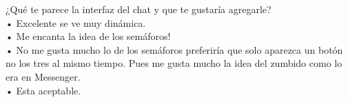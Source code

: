 \documentclass[11pt,a4paper]{report}
\begin{document}
¿Qué te parece la interfaz del chat y que te gustaría agregarle?\newline\\

• Excelente se ve muy dinámica.\newline\\

• Me encanta la idea de los semáforos!\newline\\

• No me gusta mucho lo de los semáforos preferiría que solo aparezca un botón no los\vspace{0,5cm} tres al mismo tiempo. 
Pues me gusta mucho la idea del zumbido como lo era en Messenger.\newline\\

• Esta aceptable.
\end{document}

